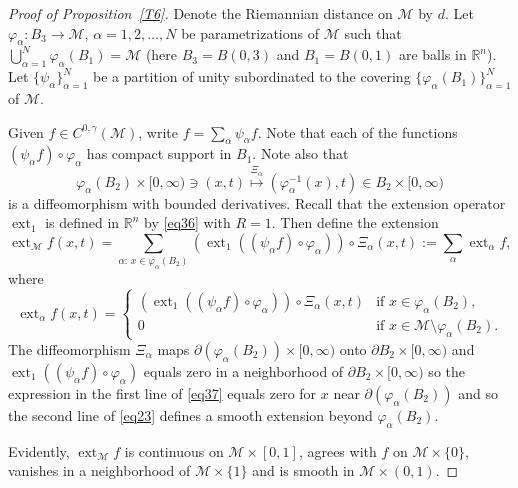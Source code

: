 \documentclass[10pt,a4paper]{amsart}
\def\ext{\operatorname{ext}}
\newcommand{\R}{\mathbb R}
\newcommand{\cM}{\mathcal M}
\begin{document}
\begin{proof}[Proof of Proposition~\ref{T6}]
Denote the Riemannian distance on $\cM$ by $d$.
Let $\varphi_\alpha:B_3\to\cM$, $\alpha=1,2,\ldots,N$ be parametrizations of $\cM$ such that $\bigcup_{\alpha=1}^N\varphi_\alpha(B_1)=\cM$ (here $B_3=B(0,3)$ and $B_1=B(0,1)$ are balls in $\R^n$). Let $\{\psi_\alpha\}_{\alpha=1}^N$ be a partition of unity subordinated to the covering $\{\varphi_\alpha(B_1)\}_{\alpha=1}^N$ of $\cM$.

Given $f\in C^{0,\gamma}(\cM)$, write $f = \sum_{\alpha}{\psi_\alpha f}$.  Note that each of the functions $(\psi_\alpha f)\circ\varphi_\alpha$ has compact support
in $B_1$. 
Note also that
$$
\varphi_\alpha(B_2)\times [0,\infty)\ni (x,t)\stackrel{\Xi_\alpha}{\longmapsto} (\varphi_\alpha^{-1}(x),t)\in B_2\times [0,\infty)
$$
is a diffeomorphism with bounded derivatives. 
Recall that the extension operator $\ext_1$ is defined in $\R^n$ by \eqref{eq36} with $R=1$.
Then define the extension
$$
\ext_{\cM} f(x,t) = \sum_{\alpha:\, x\in\varphi_\alpha(B_2)}(\ext_1((\psi_\alpha f) \circ \varphi_\alpha))  
\circ\Xi_\alpha(x,t)
:= \sum_\alpha \ext_\alpha f,
$$
where
\begin{equation}
\label{eq37}
\ext_\alpha f(x,t)=
\begin{cases}
(\ext_1((\psi_\alpha f) \circ \varphi_\alpha))\circ\Xi_\alpha(x,t)& \text{if $x\in\varphi_\alpha(B_2)$,}\\
0 & \text{if $x\in \cM\setminus\varphi_\alpha(B_2)$.}
\end{cases}
\end{equation}
The diffeomorphism $\Xi_\alpha$ maps $\partial(\varphi_\alpha(B_2))\times [0,\infty)$ onto $\partial B_2\times [0,\infty)$ and $\ext_1((\psi_\alpha f)\circ\varphi_\alpha)$ equals zero in a neighborhood of 
$\partial B_2\times [0,\infty)$ so the expression in the first line of \eqref{eq37} equals zero for $x$ near $\partial(\varphi_\alpha(B_2))$ and so the second line of \eqref{eq23} defines a smooth extension beyond 
$\varphi_\alpha(B_2)$.

Evidently, $\ext_{\cM} f$ is continuous on $\cM\times [0,1]$, agrees with $f$ on $\cM\times \{ 0 \}$, vanishes in a neighborhood of $\cM\times \{ 1\}$ and is
smooth in $\cM\times (0,1)$.


\end{proof}
\end{document}

